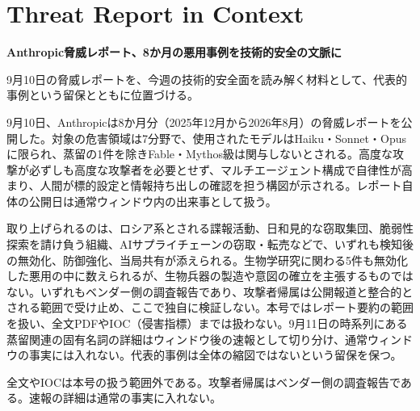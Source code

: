 \section{Threat Report in Context}
\begin{wideflow}
{\Large\bfseries Anthropic脅威レポート、8か月の悪用事例を技術的安全の文脈に}\par
\smallskip
{\color{SurveyMuted}9月10日の脅威レポートを、今週の技術的安全面を読み解く材料として、代表的事例という留保とともに位置づける。}\par
\end{wideflow}

9月10日、Anthropicは8か月分（2025年12月から2026年8月）の脅威レポートを公開した\cite{threat}。対象の危害領域は7分野で、使用されたモデルはHaiku・Sonnet・Opusに限られ、蒸留の1件を除きFable・Mythos級は関与しないとされる。高度な攻撃が必ずしも高度な攻撃者を必要とせず、マルチエージェント構成で自律性が高まり、人間が標的設定と情報持ち出しの確認を担う構図が示される。レポート自体の公開日は通常ウィンドウ内の出来事として扱う。

取り上げられるのは、ロシア系とされる諜報活動、日和見的な窃取集団、脆弱性探索を請け負う組織、AIサプライチェーンの窃取・転売などで、いずれも検知後の無効化、防御強化、当局共有が添えられる\cite{threat}。生物学研究に関わる5件も無効化した悪用の中に数えられるが、生物兵器の製造や意図の確立を主張するものではない。いずれもベンダー側の調査報告であり、攻撃者帰属は公開報道と整合的とされる範囲で受け止め、ここで独自に検証しない。本号ではレポート要約の範囲を扱い、全文PDFやIOC（侵害指標）までは扱わない。9月11日の時系列にある蒸留関連の固有名詞の詳細はウィンドウ後の速報として切り分け、通常ウィンドウの事実には入れない。代表的事例は全体の縮図ではないという留保を保つ。

\begin{claimboundary}[安全面の読み方の境界]
全文やIOCは本号の扱う範囲外である。攻撃者帰属はベンダー側の調査報告である。速報の詳細は通常の事実に入れない。
\end{claimboundary}
